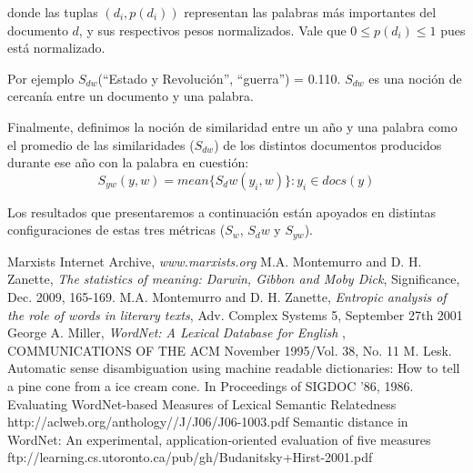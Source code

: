 \documentclass{pnastwo}
\begin{document}
\begin{article}
donde las tuplas $(d_i , p(d_i))$ representan las palabras más importantes del documento $d$, y sus respectivos pesos normalizados. Vale que $0 \leq p(d_i) \leq 1$ pues está normalizado.

Por ejemplo $S_{dw}$(“Estado y Revolución”, “guerra”) = 0.110. $S_{dw}$ es una noción de cercanía entre un documento y una palabra.

Finalmente, definimos la noción de similaridad entre un año y una palabra como el promedio de las similaridades ($S_{dw}$) 
de los distintos documentos producidos durante ese año con la palabra en cuestión:
\begin{equation}
  S_{yw}(y, w) = mean \{ S_dw(y_i, w) \} : y_i \in docs(y) 
\end{equation}

Los resultados que presentaremos a continuaci\'on est\'an apoyados en distintas configuraciones de estas tres m\'etricas ($S_w$, $S_dw$ y $S_{yw}$).

% 




\begin{thebibliography}{10}
Marxists Internet Archive, {\em www.marxists.org} %
M.A. Montemurro and D. H. Zanette, {\em The statistics of meaning: Darwin, Gibbon and Moby Dick}, Significance, Dec. 2009, 165-169.
M.A. Montemurro and D. H. Zanette, {\em Entropic analysis of the role of words in literary texts}, Adv. Complex Systems 5, September 27th 2001
George A. Miller, {\em WordNet: A Lexical Database for English }, COMMUNICATIONS OF THE ACM November 1995/Vol. 38, No. 11
M. Lesk. Automatic sense disambiguation using machine readable dictionaries: How to tell a pine cone from a ice cream cone. In Proceedings of SIGDOC ’86, 1986.
Evaluating WordNet-based Measures of Lexical Semantic Relatedness
http://aclweb.org/anthology//J/J06/J06-1003.pdf
Semantic distance in WordNet: An experimental, application-oriented evaluation of five measures
ftp://learning.cs.utoronto.ca/pub/gh/Budanitsky+Hirst-2001.pdf
\end{thebibliography}
\end{article}
\end{document}
